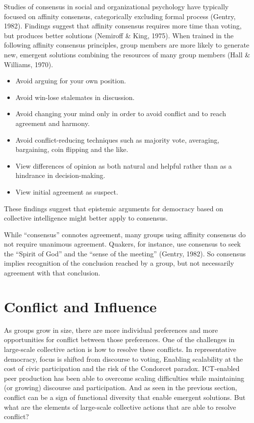 Studies of consensus in social and organizational psychology have typically focused on affinity consensus, categorically excluding formal process (Gentry, 1982). Findings suggest that affinity consensus requires more time than voting, but produces better solutions (Nemiroff \& King, 1975). When trained in the following affinity consensus principles, group members are more likely to generate new, emergent solutions combining the resources of many group members (Hall \& Williams, 1970). 
\begin{itemize}
\item{Avoid arguing for your own position.}
\item{Avoid win-lose stalemates in discussion.}
\item{Avoid changing your mind only in order to avoid conflict and to reach agreement and harmony.}
\item{Avoid conflict-reducing techniques such as majority vote, averaging, bargaining, coin flipping and the like.}
\item{View differences of opinion as both natural and helpful rather than as a hindrance in decision-making.}
\item{View initial agreement as suspect.}
\end{itemize}
These findings suggest that epistemic arguments for democracy based on collective intelligence might better apply to consensus.

While ``consensus'' connotes agreement, many groups using affinity consensus do not require unanimous agreement. Quakers, for instance, use consensus to seek the ``Spirit of God'' and the ``sense of the meeting'' (Gentry, 1982). So consensus implies recognition of the conclusion reached by a group, but not necessarily agreement with that conclusion.

\section{Conflict and Influence}
As groups grow in size, there are more individual preferences and more opportunities for conflict between those preferences. One of the challenges in large-scale collective action is how to resolve these conflicts. In representative democracy, focus is shifted from discourse to voting, 
Enabling scalability at the cost of civic participation and the risk of the Condorcet paradox. ICT-enabled peer production has been able to overcome scaling difficulties while maintaining (or growing) discourse and participation. And as seen in the previous section, conflict can be a sign of functional diversity that enable emergent solutions. But what are the elements of large-scale collective actions that are able to resolve conflict?

